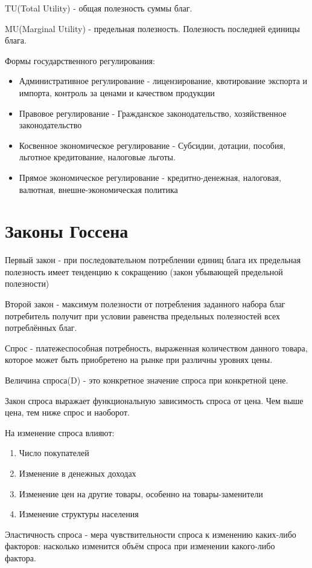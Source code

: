 \documentclass[a4paper, 12pt]{article}
\begin{document}
	TU(Total Utility) - общая полезность суммы благ.
	
	MU(Marginal Utility) - предельная полезность. Полезность последней единицы блага.
	
	Формы государственного регулирования:
	\begin{itemize}
		\item Административное регулирование - лицензирование, квотирование экспорта и импорта, контроль за ценами и качеством продукции
		\item Правовое регулирование - Гражданское законодательство, хозяйственное законодательство
		\item Косвенное экономическое регулирование - Субсидии, дотации, пособия, льготное кредитование, налоговые льготы.
		\item Прямое экономическое регулирование - кредитно-денежная, налоговая, валютная, внешне-экономическая политика
	\end{itemize}
	\section*{Законы Госсена}
	Первый закон - при последовательном потреблении единиц блага их предельная полезность имеет тенденцию к сокращению (закон убывающей предельной полезности)
	
	Второй закон - максимум полезности от потребления заданного набора благ потребитель получит при условии равенства предельных полезностей всех потреблённых благ.
	
	Спрос - платежеспособная потребность, выраженная количеством данного товара, которое может быть приобретено на рынке при различны уровнях  цены.
	
	Величина спроса(D) - это конкретное значение спроса при конкретной цене.
	
	Закон спроса выражает функциональную зависимость спроса от цена. Чем выше цена, тем ниже спрос и наоборот.
	
	На изменение спроса влияют:
	\begin{enumerate}
		\item Число покупателей
		\item Изменение в денежных доходах
		\item Изменение цен на другие товары, особенно на товары-заменители
		\item Изменение структуры населения
	\end{enumerate}

	Эластичность спроса - мера чувствительности спроса к изменению каких-либо факторов: насколько изменится объём спроса при изменении какого-либо фактора.
	
\end{document}
